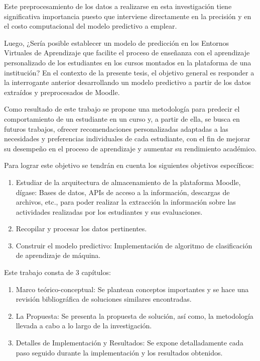 Este preprocesamiento de los datos a realizarse en esta investigación tiene significativa importancia puesto que 
interviene directamente en la precisión y en el costo computacional del modelo predictivo a emplear.

Luego, ¿Sería posible establecer un modelo de predicción en los 
Entornos Virtuales de Aprendizaje que facilite el proceso de enseñanza con el aprendizaje personalizado de los 
estudiantes en los cursos montados en la plataforma de una institución? 
En el contexto de la presente tesis, el objetivo general es responder a la interrogante anterior desarrollando 
un modelo predictivo a partir de los datos extraídos y preprocesados de Moodle. 

Como resultado de este trabajo se propone una metodología para predecir el comportamiento de un estudiante en un 
curso y, a partir de ella, se busca en futuros trabajos, ofrecer recomendaciones personalizadas adaptadas a las 
necesidades y preferencias individuales de cada estudiante, con el fin de mejorar su 
desempeño en el proceso de aprendizaje y aumentar su rendimiento académico.

Para lograr este objetivo se tendrán en cuenta los siguientes objetivos específicos:
\begin{enumerate}
    \item Estudiar de la arquitectura de almacenamiento de la plataforma Moodle, dígase: Bases de datos, APIs de acceso a la información,
          descargas de archivos, etc., para poder realizar la extracción la información sobre las actividades realizadas por los estudiantes y sus evaluaciones.
    \item Recopilar y procesar los datos pertinentes.
    \item Construir el modelo predictivo: Implementación de algoritmo de clasificación de aprendizaje de máquina.
\end{enumerate}

Este trabajo consta de 3 capítulos:
\begin{enumerate}
    \item Marco teórico-conceptual: Se plantean conceptos importantes y se hace una revisión bibliográfica de soluciones similares encontradas.
    \item La Propuesta: Se presenta la propuesta de solución, así como, la metodología llevada a cabo a lo largo de la investigación.
    \item Detalles de Implementación y Resultados: Se expone detalladamente cada paso seguido durante la implementación y los resultados obtenidos.
\end{enumerate}



